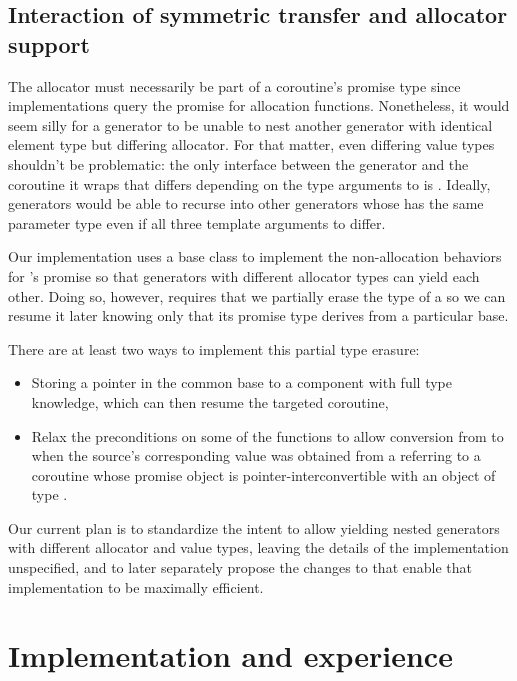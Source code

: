 \documentclass{wg21}
\begin{document}
\subsection{Interaction of symmetric transfer and allocator support}

The allocator must necessarily be part of a coroutine's promise type
since implementations query the promise for allocation functions.
Nonetheless, it would seem silly for a generator to be unable to nest another
generator with identical element type but differing allocator.
For that matter, even differing value types shouldn't be problematic:
the only interface between the generator and the coroutine it wraps
that differs depending on the type arguments to 
is .
Ideally, generators would be able to recurse into other generators
whose  has the same parameter type
even if all three template arguments to  differ.

Our implementation uses a base class to implement the non-allocation behaviors
for 's promise so that generators with different allocator types
can yield each other.
Doing so, however, requires that we partially erase
the type of a  so we can resume it later
knowing only that its promise type derives from a particular base.

There are at least two ways to implement this partial type erasure:
\begin{itemize}
\item Storing a pointer in the common base to
  a component with full type knowledge, which can then
  resume the targeted coroutine,
\item Relax the preconditions on some of the  functions
  to allow conversion from
   to  when
  the source's corresponding  value was obtained from
  a  referring to a coroutine whose promise object
  is pointer-interconvertible with an object of type .
\end{itemize}

Our current plan is to standardize
the intent to allow yielding nested generators
with different allocator and value types,
leaving the details of the implementation unspecified,
and to later separately propose the changes to 
that enable that implementation to be maximally efficient.


\section{Implementation and experience}
\end{document}
